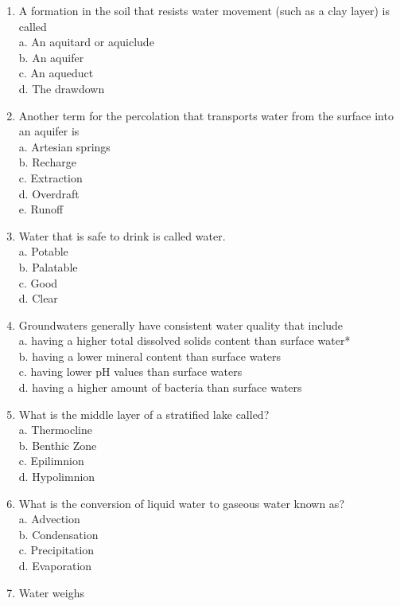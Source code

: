 \begin{enumerate}
\item A formation in the soil that resists water movement (such as a clay layer) is called\\
a. An aquitard or aquiclude\\
b. An aquifer\\
c. An aqueduct\\
d. The drawdown\\
\item Another term for the percolation that transports water from the surface into an aquifer is\\
a. Artesian springs\\
b. Recharge\\
c. Extraction\\
d. Overdraft\\
e. Runoff\\
\item Water that is safe to drink is called water.\\
a. Potable\\
b. Palatable\\
c. Good\\
d. Clear\\
\item Groundwaters generally have consistent water quality that include\\
a. having a higher total dissolved solids content than surface water*\\
b. having a lower mineral content than surface waters\\
c. having lower $\mathrm{pH}$ values than surface waters\\
d. having a higher amount of bacteria than surface waters\\
\item What is the middle layer of a stratified lake called?\\
a. Thermocline\\
b. Benthic Zone\\
c. Epilimnion\\
d. Hypolimnion\\
\item What is the conversion of liquid water to gaseous water known as?\\
a. Advection\\
b. Condensation\\
c. Precipitation\\
d. Evaporation\\
\item Water weighs\\

\end{enumerate}
